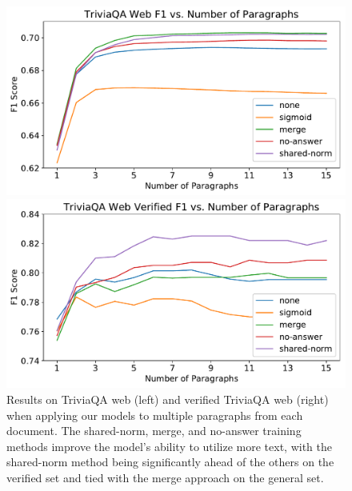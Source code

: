 \documentclass[11pt,a4paper]{article}
\begin{document}
\begin{figure}
\center

\begin{minipage}[b]{.49\textwidth}
\includegraphics[width=\columnwidth]{figures/document_web_plot-eps-converted-to.pdf}
\end{minipage}
\hfill
\begin{minipage}[b]{.49\textwidth}
\includegraphics[width=\columnwidth]{figures/document_verified_plot-eps-converted-to.pdf}
\end{minipage}


\caption{Results on TriviaQA web (left) and verified TriviaQA web (right) when applying our models to multiple paragraphs from each document. The shared-norm, merge, and no-answer training methods improve the model's ability to utilize more text, with the shared-norm method being significantly ahead of the others on the verified set and tied with the merge approach on the general set.}
\label{fig:web-document-results}
\end{figure}
\end{document}

